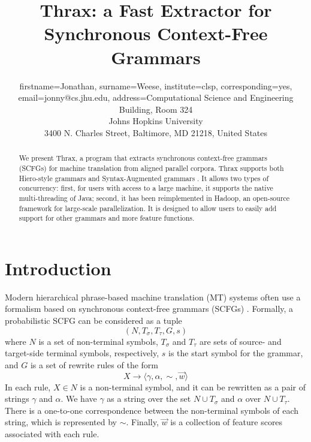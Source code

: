 \documentclass{pbml}
\begin{document}
\title{Thrax: a Fast Extractor for Synchronous Context-Free Grammars}
\author{firstname=Jonathan, surname=Weese, institute={clsp}, corresponding=yes, email={jonny@cs.jhu.edu}, address={Computational Science and Engineering Building, Room 324 \\ Johns Hopkins University \\ 3400 N. Charles Street, Baltimore, MD 21218, United States}}


\maketitle

\begin{abstract}
We present Thrax, a program that extracts synchronous context-free grammars (SCFGs) for machine translation from aligned parallel corpora. Thrax supports both Hiero-style grammars \cite{Chiang2007} and Syntax-Augmented grammars \cite{samt2006}. It allows two types of concurrency: first, for users with access to a large machine, it supports the native multi-threading of Java; second, it has been reimplemented in Hadoop, an open-source framework for large-scale parallelization. It is designed to allow users to easily add support for other grammars and more feature functions.
\end{abstract}

\section{Introduction}

Modern hierarchical phrase-based machine translation (MT) systems often use a formalism based on synchronous context-free grammars (SCFGs) \cite{Chiang2006}. Formally, a probabilistic SCFG can be considered as a tuple
$$(N,T_\sigma,T_\tau,G,s)$$
where $N$ is a set of non-terminal symbols, $T_\sigma$ and $T_\tau$ are sets of source- and target-side terminal symbols, respectively, $s$ is the start symbol for the grammar, and $G$ is a set of rewrite rules of the form
$$X \to \langle \gamma,\alpha,\sim,\vec{w} \rangle$$
In each rule, $X \in N$ is a non-terminal symbol, and it can be rewritten as a pair of strings $\gamma$ and $\alpha$. We have $\gamma$ as a string over the set $N \cup T_\sigma$ and $\alpha$ over $N \cup T_\tau$. There is a one-to-one correspondence between the non-terminal symbols of each string, which is represented by $\sim$. Finally, $\vec{w}$ is a collection of feature scores associated with each rule.
\end{document}
